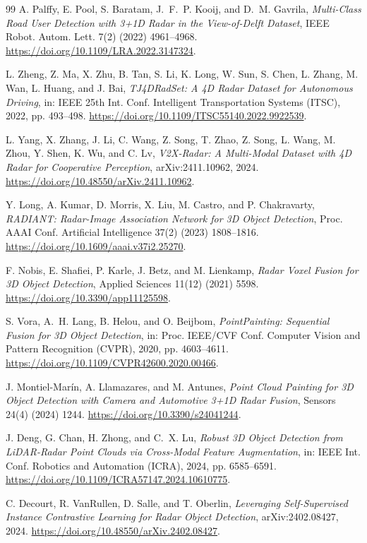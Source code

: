 \begin{thebibliography}{99}
A. Palffy, E. Pool, S. Baratam, J.~F.~P. Kooij, and D.~M. Gavrila,
\emph{Multi-Class Road User Detection with 3+1D Radar in the View-of-Delft
Dataset}, IEEE Robot. Autom. Lett. 7(2) (2022) 4961--4968.
\url{https://doi.org/10.1109/LRA.2022.3147324}.

L. Zheng, Z. Ma, X. Zhu, B. Tan, S. Li, K. Long, W. Sun, S. Chen, L. Zhang,
M. Wan, L. Huang, and J. Bai,
\emph{TJ4DRadSet: A 4D Radar Dataset for Autonomous Driving},
in: IEEE 25th Int. Conf. Intelligent Transportation Systems (ITSC), 2022,
pp. 493--498.
\url{https://doi.org/10.1109/ITSC55140.2022.9922539}.

L. Yang, X. Zhang, J. Li, C. Wang, Z. Song, T. Zhao, Z. Song, L. Wang,
M. Zhou, Y. Shen, K. Wu, and C. Lv,
\emph{V2X-Radar: A Multi-Modal Dataset with 4D Radar for Cooperative
Perception}, arXiv:2411.10962, 2024.
\url{https://doi.org/10.48550/arXiv.2411.10962}.

Y. Long, A. Kumar, D. Morris, X. Liu, M. Castro, and P. Chakravarty,
\emph{RADIANT: Radar-Image Association Network for 3D Object Detection},
Proc. AAAI Conf. Artificial Intelligence 37(2) (2023) 1808--1816.
\url{https://doi.org/10.1609/aaai.v37i2.25270}.

F. Nobis, E. Shafiei, P. Karle, J. Betz, and M. Lienkamp,
\emph{Radar Voxel Fusion for 3D Object Detection},
Applied Sciences 11(12) (2021) 5598.
\url{https://doi.org/10.3390/app11125598}.

S. Vora, A.~H. Lang, B. Helou, and O. Beijbom,
\emph{PointPainting: Sequential Fusion for 3D Object Detection},
in: Proc. IEEE/CVF Conf. Computer Vision and Pattern Recognition (CVPR),
2020, pp. 4603--4611.
\url{https://doi.org/10.1109/CVPR42600.2020.00466}.

J. Montiel-Mar\'in, A. Llamazares, and M. Antunes,
\emph{Point Cloud Painting for 3D Object Detection with Camera and Automotive
3+1D Radar Fusion}, Sensors 24(4) (2024) 1244.
\url{https://doi.org/10.3390/s24041244}.

J. Deng, G. Chan, H. Zhong, and C.~X. Lu,
\emph{Robust 3D Object Detection from LiDAR-Radar Point Clouds via
Cross-Modal Feature Augmentation}, in: IEEE Int. Conf. Robotics and
Automation (ICRA), 2024, pp. 6585--6591.
\url{https://doi.org/10.1109/ICRA57147.2024.10610775}.

C. Decourt, R. VanRullen, D. Salle, and T. Oberlin,
\emph{Leveraging Self-Supervised Instance Contrastive Learning for Radar
Object Detection}, arXiv:2402.08427, 2024.
\url{https://doi.org/10.48550/arXiv.2402.08427}.


\end{thebibliography}
